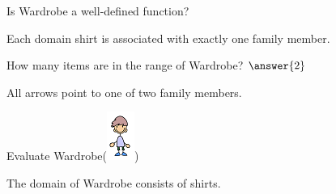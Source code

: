 \documentclass{ximera}
\begin{document}
\begin{exercise}
Is Wardrobe a well-defined function?
  \begin{multipleChoice}
  \end{multipleChoice}
  \begin{feedback}
Each domain shirt is associated with exactly one family member.
  \end{feedback}
\end{exercise}





\begin{exercise}
How many items are in the range of Wardrobe? $\answer{2}$
  \begin{feedback}
All arrows point to one of two family members.
  \end{feedback}
\end{exercise}





\begin{exercise}
Evaluate Wardrobe({\includegraphics[width=34px,height=60px]{pics/elements/family/family5.png}})
  \begin{multipleChoice}
  \end{multipleChoice}
  \begin{feedback}
The domain of Wardrobe consists of shirts.
  \end{feedback}
\end{exercise}
\end{document}
